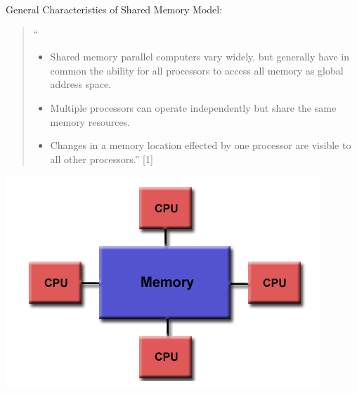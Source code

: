 \documentclass[letterpaper,10pt,openany,oneside]{sphinxmanual}
\begin{document}
General Characteristics of Shared Memory Model:
\begin{quote}

``
\begin{itemize}
\item {} 
Shared memory parallel computers vary widely, but generally have in common the ability for all processors to access all memory as global address space.

\item {} 
Multiple processors can operate independently but share the same memory resources.

\item {} 
Changes in a memory location effected by one processor are visible to all other processors.'' {[}1{]}

\end{itemize}
\end{quote}

{\hfill\includegraphics{SharedMemoryUMA.png}\hfill}
\end{document}

